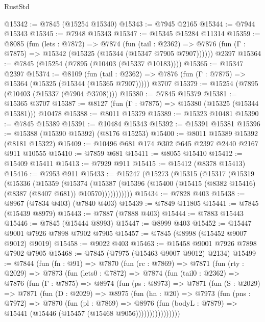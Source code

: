 \begin{lexlean}{RustStd}
\begin{coremodule}
@15342 := @7845 (@15254 @15340)
@15343 := @7945 @2165
@15344 := @7944 @15343
@15345 := @7948 @15343
@15347 := @15345 @15284 @11314
@15359 := @8085
    (fun (lets : @7872) =>
    @7874
      (fun (tail : @2362) =>
      @7876 (fun (Γ : @7875) => @15342 (@15325 (@15344 (@15347 @7905 @7907))))))
    @2397
@15364 := @7845 (@15254 (@7895 (@10403 (@15337 @10183))))
@15365 := @15347 @2397
@15374 := @8109
    (fun (tail : @2362) => @7876 (fun (Γ : @7875) => @15364 (@15325 (@15344 (@15365 @7907)))))
    @3707
@15379 := @15254 (@7895 (@10403 (@15337 (@7904 @3708))))
@15380 := @7845 @15379
@15381 := @15365 @3707
@15387 := @8127 (fun (Γ : @7875) => @15380 (@15325 (@15344 @15381))) @10478
@15388 := @8011 @15379
@15389 := @15323 @10481
@15390 := @7845 @15389
@15391 := @10484 @15343
@15392 := @15391 @15381
@15396 := @15388 (@15390 @15392) (@8176 @15253)
@15400 := @8011 @15389 @15392 (@8181 @15322)
@15409 := @10496 @681 @174 @302 @645 @2397 @2440 @2167 @911 @10555
@15410 := @7859 @681
@15411 := @8055 @15410
@15412 := @15409 @15411
@15413 := @7929 @911
@15415 := @15412 (@8378 @15413)
@15416 := @7953 @911
@15433 := @15247
    (@15273
      (@15315
        (@15317
          (@15319
            (@15336
              (@15359
                (@15374
                  (@15387
                    (@15396 (@15400 (@15415 (@8382 @15416) (@8387 (@8407 @681)) @10570)))))))))))
@15434 := @7828 @403
@15438 := @8967 (@7834 @403) (@7840 @403)
@15439 := @7849 @11805
@15441 := @7845 (@15439 @8979)
@15443 := @7887 (@7888 @403)
@15444 := @7883 @15443
@15446 := @7845 (@15444 @8993)
@15447 := @8999 @403
@15452 := @15447 @9001 @7926 @7898 @7902 @7905
@15457 := @7845 (@8998 (@15452 @9007 @9012) @9019)
@15458 := @9022 @403
@15463 := @15458 @9001 @7926 @7898 @7902 @7905
@15468 := @7845 (@7975 (@15463 @9007 @9012) @2134)
@15499 := @7844
    (fun (fn : @91) =>
    @7870
      (fun (rc : @7869) =>
      @7871
        (fun (rty : @2029) =>
        @7873
          (fun (lets0 : @7872) =>
          @7874
            (fun (tail0 : @2362) =>
            @7876
              (fun (Γ : @7875) =>
              @8974
                (fun (ps : @8973) =>
                @7871
                  (fun (S : @2029) =>
                  @7871
                    (fun (D : @2029) =>
                    @8975
                      (fun (hn : @20) =>
                      @7973
                        (fun (pns : @7972) =>
                        @7870
                          (fun (pl : @7869) =>
                          @8976
                            (fun (bodyL : @7879) =>
                            @15441 (@15446 (@15457 (@15468 @9056))))))))))))))))

\end{coremodule}
\end{lexlean}
